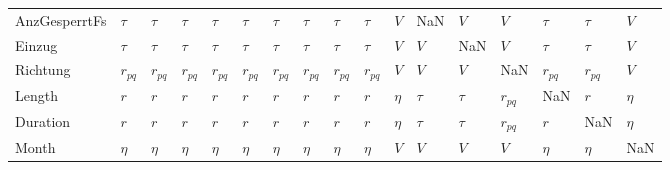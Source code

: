 \begin{tabular}{lllllllllllllllll}
AnzGesperrtFs &    $\tau$ &    $\tau$ &    $\tau$ &    $\tau$ &    $\tau$ &    $\tau$ &    $\tau$ &    $\tau$ &    $\tau$ &     $V$ &           NaN &     $V$ &       $V$ &    $\tau$ &    $\tau$ &     $V$ \\
Einzug        &    $\tau$ &    $\tau$ &    $\tau$ &    $\tau$ &    $\tau$ &    $\tau$ &    $\tau$ &    $\tau$ &    $\tau$ &     $V$ &           $V$ &     NaN &       $V$ &    $\tau$ &    $\tau$ &     $V$ \\
Richtung      &  $r_{pq}$ &  $r_{pq}$ &  $r_{pq}$ &  $r_{pq}$ &  $r_{pq}$ &  $r_{pq}$ &  $r_{pq}$ &  $r_{pq}$ &  $r_{pq}$ &     $V$ &           $V$ &     $V$ &       NaN &  $r_{pq}$ &  $r_{pq}$ &     $V$ \\
Length        &       $r$ &       $r$ &       $r$ &       $r$ &       $r$ &       $r$ &       $r$ &       $r$ &       $r$ &  $\eta$ &        $\tau$ &  $\tau$ &  $r_{pq}$ &       NaN &       $r$ &  $\eta$ \\
Duration      &       $r$ &       $r$ &       $r$ &       $r$ &       $r$ &       $r$ &       $r$ &       $r$ &       $r$ &  $\eta$ &        $\tau$ &  $\tau$ &  $r_{pq}$ &       $r$ &       NaN &  $\eta$ \\
Month         &    $\eta$ &    $\eta$ &    $\eta$ &    $\eta$ &    $\eta$ &    $\eta$ &    $\eta$ &    $\eta$ &    $\eta$ &     $V$ &           $V$ &     $V$ &       $V$ &    $\eta$ &    $\eta$ &     NaN \\
\bottomrule
\end{tabular}
